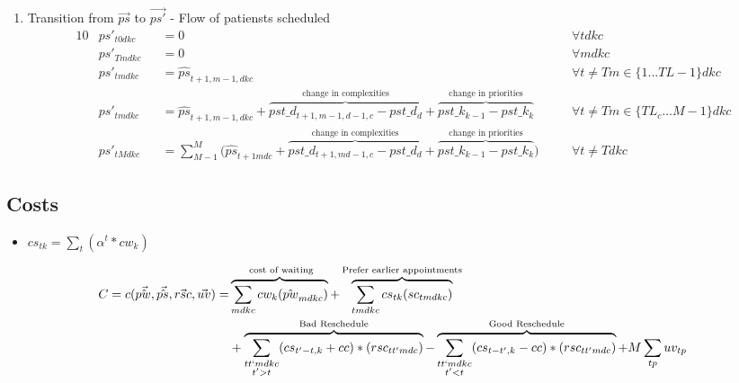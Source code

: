 \begin{enumerate}
	
	\item Transition from $\vec{ps}$ to $\vec{ps'}$ - Flow of patiensts scheduled
	\begin{alignat}{10}
		& ps'_{t0dkc} 
			&& = 0 \quad
			&& \forall tdkc \\  
		& ps'_{Tmdkc} 
			&& = 0 \quad
			&& \forall mdkc \\  
		& ps'_{tmdkc} 
			&& = \hat{ps}_{t+1,m-1,dkc} \quad 
			&& \forall t \ne T m \in \{ 1... TL-1 \} dkc \\ 
		& ps'_{tmdkc} 
			&& = \hat{ps}_{t+1,m-1,dkc} + 
			\overbrace{pst\_d_{t+1,m-1,d-1,c} - pst\_d_{d}}^\text{
				change in complexities}  + 
			\overbrace{pst\_k_{k-1} - pst\_k_{k}}^\text{
				change in priorities} \quad 
			&& \forall t \ne T m \in \{ TL_{c}...M-1 \} dkc \\  
		& ps'_{tMdkc} 
			&& = \sum_{M-1}^{M} \big( 
			\hat{ps}_{t+1mdc} + 
			\overbrace{pst\_d_{t+1,md-1,c} - pst\_d_{d}}^\text{
				change in complexities} + 
			\overbrace{pst\_k_{k-1} - pst\_k_{k}}^\text{
				change in priorities} \big) \quad
			&& \forall t \ne T dkc
	\end{alignat}
\end{enumerate}

\subsection{Costs}

\begin{itemize}
	\item $cs_{tk} = \sum_t (\alpha^t * cw_{k})$
\end{itemize}

\begin{equation}\begin{alignedat}{10}
		& C = c(\vec{\hat{pw}}, \vec{\hat{ps}}, \vec{rsc}, \vec{uv}) = 
		&& 
		\overbrace{ \sum_{mdkc} cw_{k} (\hat{pw}_{mdkc}) }^\text{
			cost of waiting}  + 
		\overbrace{
			\sum_{tmdkc} cs_{tk} (sc_{tmdkc})
		}^\text{Prefer earlier appointments} \\ 
		&	&&  +
		\overbrace{
			\sum_{
				\substack{tt`mdkc \\ t' > t}} 
			(cs_{t'-t, k} + cc) * (rsc_{tt'mdc})}^\text{Bad Reschedule} - 
		\overbrace{ 
			\sum_{
				\substack{tt`mdkc \\ t' < t}}
			(cs_{t-t', k} - cc) * (rsc_{tt'mdc})}^\text{Good Reschedule} + 
		M \sum_{tp} uv_{tp}
\end{alignedat}\end{equation}